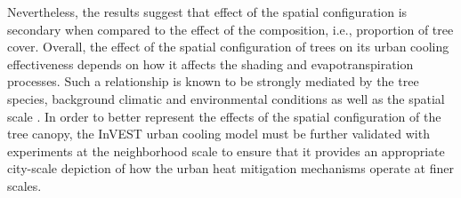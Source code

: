 \documentclass[10pt,letterpaper]{article}
\begin{document}
Nevertheless, the results suggest that effect of the spatial configuration is secondary when compared to the effect of the composition, i.e., proportion of tree cover.
Overall, the effect of the spatial configuration of trees on its urban cooling effectiveness depends on how it affects the shading and evapotranspiration processes.
Such a relationship is known to be strongly mediated by the tree species, background climatic and environmental conditions as well as the spatial scale \cite{li2013relationship,estoque2017effects,zhou2017effects,jiao2017patch,yu2018strong,yan2019testing,wang2020significant,terfa2020spatial}.
In order to better represent the effects of the spatial configuration of the tree canopy, the InVEST urban cooling model must be further validated with experiments at the neighborhood scale to ensure that it provides an appropriate city-scale depiction of how the urban heat mitigation mechanisms operate at finer scales.
\end{document}
